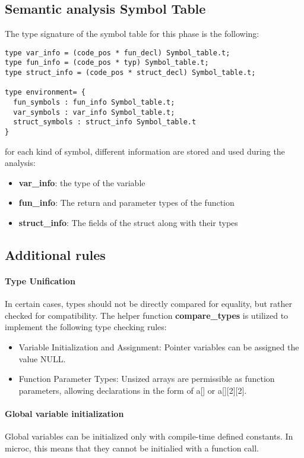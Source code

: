 \documentclass{article}
\begin{document}
\subsection{Semantic analysis Symbol Table}
The type signature of the symbol table for this phase is the following:

\begin{lstlisting}[linewidth=13cm, frame=single, basicstyle=\ttfamily\fontsize{8pt}{14pt}]
type var_info = (code_pos * fun_decl) Symbol_table.t;
type fun_info = (code_pos * typ) Symbol_table.t;
type struct_info = (code_pos * struct_decl) Symbol_table.t;

type environment= {
  fun_symbols : fun_info Symbol_table.t;
  var_symbols : var_info Symbol_table.t;
  struct_symbols : struct_info Symbol_table.t
}
\end{lstlisting}
for each kind of symbol, different information are stored and used during the analysis:
\begin{itemize}
  \item \textbf{var\_info}: the type of the variable
  \item \textbf{fun\_info}: The return and parameter types of the function
  \item \textbf{struct\_info}: The fields of the struct along with their types
\end{itemize}


\subsection{Additional rules}
\paragraph*{Type Unification}
   In certain cases, types should not be directly compared for equality, but rather checked for compatibility.
   The helper function \textbf{compare\_types} is utilized to implement the following type checking rules:
  \begin{itemize}
    \item Variable Initialization and Assignment: Pointer variables can be assigned the value NULL.
    \item Function Parameter Types: Unsized arrays are permissible as function parameters, allowing declarations in the form of a[] or a[][2][2].
  \end{itemize}

\paragraph*{Global variable initialization}
Global variables can be initialized only with compile-time defined constants. In microc, this means that
they cannot be initialied with a function call.
\end{document}
